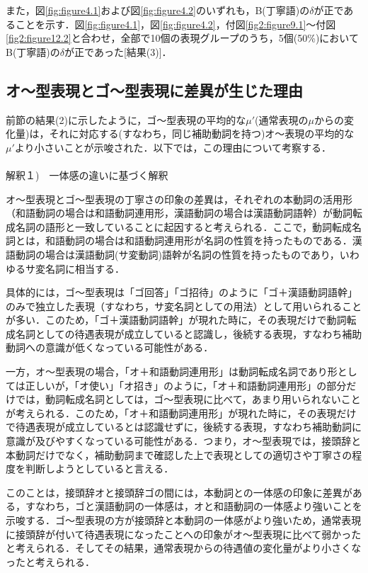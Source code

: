 また，図\ref{fig:figure4.1}および図\ref{fig:figure4.2}のいずれも，B(丁寧語)の$\delta$が正であることを示す．図\ref{fig:figure4.1}，図\ref{fig:figure4.2}，付図\ref{fig2:figure9.1}〜付図\ref{fig2:figure12.2}と合わせ，全部で10個の表現グループのうち，5個(50\%)においてB(丁寧語)の$\delta$が正であった[結果(3)]．

\subsection{オ〜型表現とゴ〜型表現に差異が生じた理由}\label{sec:5.3}

前節の結果(2)に示したように，ゴ〜型表現の平均的な$\mu'$(通常表現の$\mu$からの変化量)は，それに対応する(すなわち，同じ補助動詞を持つ)オ〜表現の平均的な$\mu'$より小さいことが示唆された．以下では，この理由について考察する．
\\
\\
解釈１)　一体感の違いに基づく解釈

オ〜型表現とゴ〜型表現の丁寧さの印象の差異は，それぞれの本動詞の活用形（和語動詞の場合は和語動詞連用形，漢語動詞の場合は漢語動詞語幹）が動詞転成名詞の語形と一致していることに起因すると考えられる．ここで，動詞転成名詞とは，和語動詞の場合は和語動詞連用形が名詞の性質を持ったものである．漢語動詞の場合は漢語動詞(サ変動詞)語幹が名詞の性質を持ったものであり，いわゆるサ変名詞に相当する．

具体的には，ゴ〜型表現は「ゴ回答」「ゴ招待」のように「ゴ＋漢語動詞語幹」のみで独立した表現（すなわち，サ変名詞としての用法）として用いられることが多い．このため，「ゴ＋漢語動詞語幹」が現れた時に，その表現だけで動詞転成名詞としての待遇表現が成立していると認識し，後続する表現，すなわち補助動詞への意識が低くなっている可能性がある．

一方，オ〜型表現の場合，「オ＋和語動詞連用形」は動詞転成名詞であり形としては正しいが，「オ使い」「オ招き」のように，「オ＋和語動詞連用形」の部分だけでは，動詞転成名詞としては，ゴ〜型表現に比べて，あまり用いられないことが考えられる．このため，「オ＋和語動詞連用形」が現れた時に，その表現だけで待遇表現が成立しているとは認識せずに，後続する表現，すなわち補助動詞に意識が及びやすくなっている可能性がある．つまり，オ〜型表現では，接頭辞と本動詞だけでなく，補助動詞まで確認した上で表現としての適切さや丁寧さの程度を判断しようとしていると言える．

このことは，接頭辞オと接頭辞ゴの間には，本動詞との一体感の印象に差異がある，すなわち，ゴと漢語動詞の一体感は，オと和語動詞の一体感より強いことを示唆する．ゴ〜型表現の方が接頭辞と本動詞の一体感がより強いため，通常表現に接頭辞が付いて待遇表現になったことへの印象がオ〜型表現に比べて弱かったと考えられる．そしてその結果，通常表現からの待遇値の変化量がより小さくなったと考えられる．


